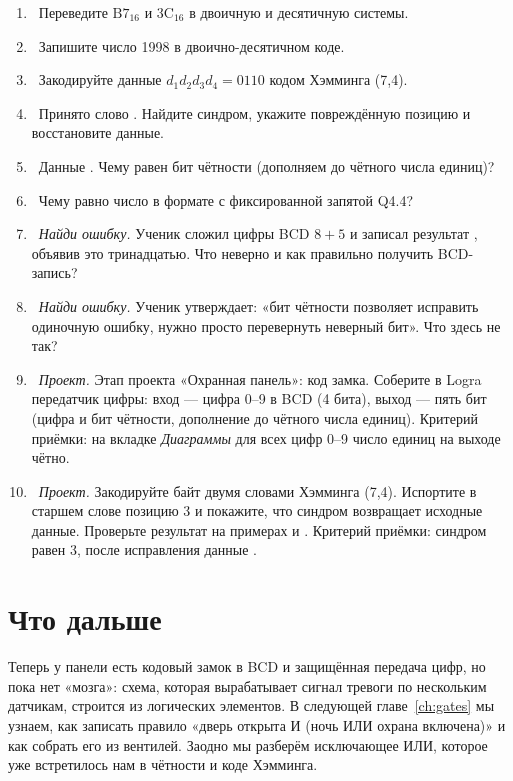 \begin{taskbox}
\begin{enumerate}
  \item {}~Переведите $\text{B7}_{16}$ и $\text{3C}_{16}$ в двоичную и десятичную системы.
  \item {}~Запишите число 1998 в двоично-десятичном коде.
  \item {}~Закодируйте данные $d_1d_2d_3d_4 = 0110$ кодом Хэмминга (7,4).
  \item {}~Принято слово . Найдите синдром, укажите повреждённую позицию и восстановите данные.
  \item {}~Данные . Чему равен бит чётности (дополняем до чётного числа единиц)?
  \item {}~Чему равно число  в формате с фиксированной запятой Q4.4?
  \item {}~\emph{Найди ошибку.} Ученик сложил цифры BCD $8+5$ и записал результат , объявив это тринадцатью. Что неверно и как правильно получить BCD-запись?
  \item {}~\emph{Найди ошибку.} Ученик утверждает: «бит чётности позволяет исправить одиночную ошибку, нужно просто перевернуть неверный бит». Что здесь не так?
  \item {}~\emph{Проект.} Этап проекта «Охранная панель»: код замка. Соберите в Logra передатчик цифры: вход --- цифра 0--9 в BCD (4 бита), выход --- пять бит (цифра и бит чётности, дополнение до чётного числа единиц). Критерий приёмки: на вкладке \emph{Диаграммы} для всех цифр 0--9 число единиц на выходе чётно.
  \item {}~\emph{Проект.} Закодируйте байт  двумя словами Хэмминга (7,4). Испортите в старшем слове позицию 3 и покажите, что синдром возвращает исходные данные. Проверьте результат на примерах  и . Критерий приёмки: синдром равен 3, после исправления данные .
\end{enumerate}
\end{taskbox}

\section{Что дальше}

Теперь у панели есть кодовый замок в BCD и защищённая передача цифр, но
пока нет «мозга»: схема, которая вырабатывает сигнал тревоги по нескольким
датчикам, строится из логических элементов. В следующей главе~\ref{ch:gates}
мы узнаем, как записать правило «дверь открыта И (ночь ИЛИ охрана включена)»
и как собрать его из вентилей. Заодно мы разберём исключающее ИЛИ, которое уже
встретилось нам в чётности и коде Хэмминга.
